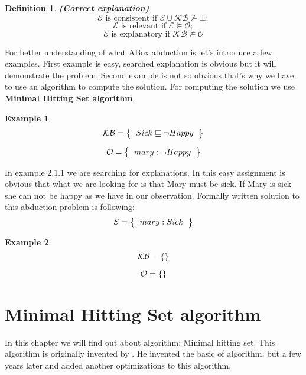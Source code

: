 \documentclass[12pt,a4paper]{article}
\newtheorem{definition}{Definition}[subsection]
\newtheorem{example}{Example}[subsection]
\begin{document}
\begin{definition}{\textbf{(Correct explanation)}}
	\[ \mathcal{E} \text{ is consistent if } \mathcal{E} \cup \mathcal{KB} \not \models \mathcal{\bot}; \] 
	\[ \mathcal{E} \text{ is relevant if } \mathcal{E} \not \models \mathcal{O}; \]
	\[ \mathcal{E} \text{ is explanatory if } \mathcal{KB} \not \models \mathcal{O} \]
\end{definition}

For better understanding of what ABox abduction is let's introduce a few examples. First example is easy, searched explanation is obvious but it will demonstrate the problem. Second example is not so obvious that's why we have to use an algorithm to compute the solution. For computing the solution we use \textbf{Minimal Hitting Set algorithm}. 

\begin{example}	
	\[ 
	\mathcal{KB} = \left\{
	\begin{tabular}{l c}
	$Sick \sqsubseteq \neg Happy$
	\end{tabular}
	\right \}
	\]
	
	\[ 
	\mathcal{O} = \left\{
	\begin{tabular}{l c}
	$mary : \neg Happy$
	\end{tabular}
	\right \}
	\]								
\end{example}

In example 2.1.1 we are searching for explanations. In this easy assignment is obvious that what we are looking for is that Mary must be sick. If Mary is sick she can not be happy as we have in our observation. Formally written solution to this abduction problem is following:
\[ 
\mathcal{E} = \left\{
\begin{tabular}{l c}
$mary : Sick$
\end{tabular}
\right \}
\]

\begin{example}
	\[ 
	\mathcal{KB} = \left\{
	\begin{tabular}{l c}
	\end{tabular}
	\right \}
	\]
	
	\[ 
	\mathcal{O} = \left\{
	\begin{tabular}{l c}
	\end{tabular}
	\right \}
	\]								
	
\end{example}


\section{Minimal Hitting Set algorithm}
In this chapter we will find out about algorithm: Minimal hitting set. This algorithm is originally invented by \citep{reiterHS}. He invented the basic of algorithm, but a few years later \citep{greinerReitersCorrection} and \citep{wotawaReitersVariant} added another optimizations to this algorithm.
\end{document}
